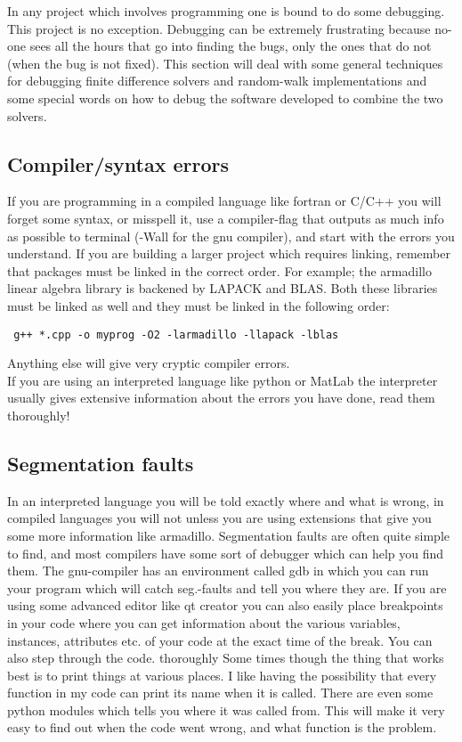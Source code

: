In any project which involves programming one is bound to do some debugging. This project is no exception. 
Debugging can be extremely frustrating because no-one sees all the hours that go into finding the bugs, only the ones that do not (when the bug is not fixed). 
This section will deal with some general techniques for debugging finite difference solvers and random-walk implementations and some special words on how to debug the software developed to combine the two solvers.

\subsection{Compiler/syntax errors}

If you are programming in a compiled language like fortran or C/C++ you will forget some syntax, or misspell it, use a compiler-flag that outputs as much info as possible to terminal (-Wall for the gnu compiler), and start with the errors you understand. If you are building a larger project which requires linking, remember that packages must be linked in the correct order. For example; the armadillo linear algebra library is backened by LAPACK and BLAS. Both these libraries must be linked as well and they must be linked in the following order:
\begin{lstlisting}
 g++ *.cpp -o myprog -O2 -larmadillo -llapack -lblas
\end{lstlisting}
Anything else will give very cryptic compiler errors. \\
If you are using an interpreted language like python or MatLab the interpreter usually gives extensive information about the errors you have done, read them thoroughly!

\subsection{Segmentation faults}
In an interpreted language you will be told exactly where and what is wrong, in compiled languages you will not unless you are using extensions that give you some more information like armadillo. Segmentation faults are often quite simple to find, and most compilers have some sort of debugger which can help you find them. 
The gnu-compiler has an environment called gdb in which you can run your program which will catch seg.-faults and tell you where they are. If you are using some advanced editor like qt creator you can also easily place breakpoints in your code where you can get information about the various variables, instances, attributes etc. of your code at the exact time of the break. You can also step through the code. thoroughly
Some times though the thing that works best is to print things at various places. I like having the possibility that every function in my code can print its name when it is called. There are even some python modules which tells you where it was called from. This will make it very easy to find out when the code went wrong, and what function is the problem.

